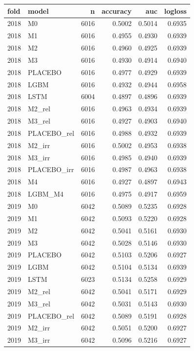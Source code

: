 \begin{tabular}{llrrrr}
\toprule
fold & model & n & accuracy & auc & logloss \\
\midrule
2018 & M0 & 6016 & 0.5002 & 0.5014 & 0.6935 \\
2018 & M1 & 6016 & 0.4955 & 0.4930 & 0.6939 \\
2018 & M2 & 6016 & 0.4960 & 0.4925 & 0.6939 \\
2018 & M3 & 6016 & 0.4930 & 0.4914 & 0.6940 \\
2018 & PLACEBO & 6016 & 0.4977 & 0.4929 & 0.6939 \\
2018 & LGBM & 6016 & 0.4932 & 0.4944 & 0.6958 \\
2018 & LSTM & 6004 & 0.4897 & 0.4896 & 0.6939 \\
2018 & M2\_rel & 6016 & 0.4963 & 0.4934 & 0.6939 \\
2018 & M3\_rel & 6016 & 0.4927 & 0.4903 & 0.6940 \\
2018 & PLACEBO\_rel & 6016 & 0.4988 & 0.4932 & 0.6939 \\
2018 & M2\_irr & 6016 & 0.5002 & 0.4953 & 0.6938 \\
2018 & M3\_irr & 6016 & 0.4985 & 0.4940 & 0.6939 \\
2018 & PLACEBO\_irr & 6016 & 0.4987 & 0.4963 & 0.6938 \\
2018 & M4 & 6016 & 0.4927 & 0.4897 & 0.6943 \\
2018 & LGBM\_M4 & 6016 & 0.4975 & 0.4917 & 0.6959 \\
2019 & M0 & 6042 & 0.5089 & 0.5235 & 0.6928 \\
2019 & M1 & 6042 & 0.5093 & 0.5220 & 0.6928 \\
2019 & M2 & 6042 & 0.5041 & 0.5161 & 0.6930 \\
2019 & M3 & 6042 & 0.5028 & 0.5146 & 0.6930 \\
2019 & PLACEBO & 6042 & 0.5103 & 0.5206 & 0.6927 \\
2019 & LGBM & 6042 & 0.5104 & 0.5134 & 0.6939 \\
2019 & LSTM & 6023 & 0.5134 & 0.5258 & 0.6929 \\
2019 & M2\_rel & 6042 & 0.5041 & 0.5171 & 0.6929 \\
2019 & M3\_rel & 6042 & 0.5031 & 0.5143 & 0.6930 \\
2019 & PLACEBO\_rel & 6042 & 0.5089 & 0.5191 & 0.6928 \\
2019 & M2\_irr & 6042 & 0.5051 & 0.5200 & 0.6927 \\
2019 & M3\_irr & 6042 & 0.5096 & 0.5216 & 0.6927 \\

\end{tabular}
